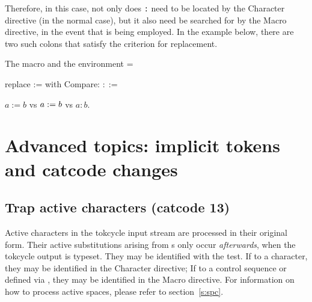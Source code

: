 \documentclass[10pt]{article}
\newcommand\TokCycle{\textsf{tokcycle}}
\begin{document}
\medskip
Therefore, in this case, not only does \texttt{:} need to be located by
  the Character directive (in the normal case), but it also need be searched
  for by the Macro directive, in the event that
   is being employed.
In the example below, there are two such colons that satisfy the criterion for 
  replacement.

\begingroup

\begin{exampleC}[]{The  macro and the 
  environment}
\newcommand\coleqchek[1]{\tcpeek\z
  \ifx=\z\tcpop\z\addcytoks{\coloneqq}\else\addcytoks{#1}\fi}
\tokcycleenvironment\subcoloneqq
{\tctestifx{:##1}{\coleqchek{##1}}{\addcytoks{##1}}}%
{}
{%
  {\coleqchek{##1}}{}}
{}
\end{exampleC}

\begin{exampleA}[lefthand width=6cm]{replace {:=} with } 
\subcoloneqq
\LARGE Compare: $::=$

$a := b$ vs 
  $a \ordinarycolon= b$ vs 
  $a:b$.
\endsubcoloneqq
\end{exampleA}

\endgroup

\section{Advanced topics: implicit tokens and catcode changes}

\subsection{Trap active characters (catcode 13)}

\begingroup
Active characters in the \TokCycle{} input stream are processed in
  their original form.
Their active substitutions arising from s 
  only occur \textit{afterwards}, when
  the \TokCycle{} output is typeset.
They may be identified with the  test.
If  to a character, they may be identified in the Character
  directive;
If  to a control sequence or defined via ,
  they may be identified in the Macro directive.
For information on how to process active spaces, please refer to 
  section~\ref{s:spc}.
\let\svt T
\end{document}
